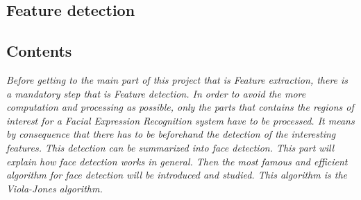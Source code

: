   \begin{titlepage}
    \vspace*{\fill}
      \part{Feature detection}
    \vspace*{\fill}
  \end{titlepage}

\chapter*{Contents}

\textit{Before getting to the main part of this project that is Feature extraction, there is a mandatory step that is Feature detection. In order to avoid the more computation and processing as possible, only the parts that contains the regions of interest for a Facial Expression Recognition system have to be processed. It means by consequence that there has to be beforehand the detection of the interesting features. This detection can be summarized into face detection. This part will explain how face detection works in general. Then the most famous and efficient algorithm for face detection will be introduced and studied. This algorithm is the Viola-Jones algorithm.}
\pagebreak


\newpage


